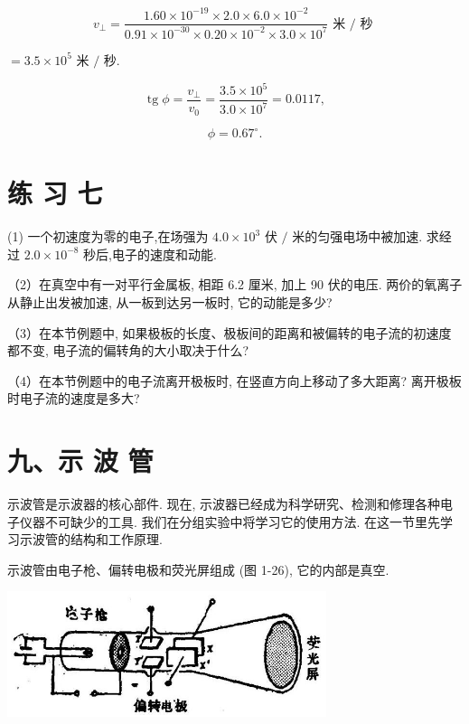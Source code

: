 \documentclass[10pt]{article}
\begin{document}
\[
{v}_{ \bot } = \frac{{1.60} \times {10}^{-{19}} \times {2.0} \times {6.0} \times {10}^{-2}}{{0.91} \times {10}^{-{30}} \times {0.20} \times {10}^{-2} \times {3.0} \times {10}^{7}}\text{ 米 }/\text{ 秒 }
\]

\(= {3.5} \times {10}^{5}\) 米 \(/\) 秒.

\[
\operatorname{tg}\phi = \frac{{v}_{ \bot }}{{v}_{0}} = \frac{{3.5} \times {10}^{5}}{{3.0} \times {10}^{7}} = {0.0117},
\]

\[
\phi = {0.67}^{ \circ }\text{.}
\]

\section*{练 习 七}

(1) 一个初速度为零的电子,在场强为 \({4.0} \times {10}^{3}\) 伏 \(/\) 米的匀强电场中被加速. 求经过 \({2.0} \times {10}^{-8}\) 秒后,电子的速度和动能.

（2）在真空中有一对平行金属板, 相距 6.2 厘米, 加上 90 伏的电压. 两价的氧离子从静止出发被加速, 从一板到达另一板时, 它的动能是多少?

（3）在本节例题中, 如果极板的长度、极板间的距离和被偏转的电子流的初速度都不变, 电子流的偏转角的大小取决于什么?

（4）在本节例题中的电子流离开极板时, 在竖直方向上移动了多大距离? 离开极板时电子流的速度是多大?

\section*{九、示 波 管}

示波管是示波器的核心部件. 现在, 示波器已经成为科学研究、检测和修理各种电子仪器不可缺少的工具. 我们在分组实验中将学习它的使用方法. 在这一节里先学习示波管的结构和工作原理.

示波管由电子枪、偏转电极和荧光屏组成 (图 1-26), 它的内部是真空.

\begin{center}
\includegraphics[max width=0.7\textwidth]{images/01913056-1f15-74d8-9184-9aab52c9d66b_41_763965.jpg}
\end{center}
\end{document}
